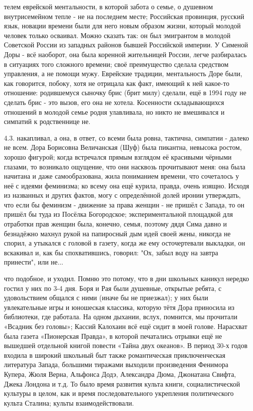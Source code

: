 \label{42-1}
телем еврейской ментальности, в которой забота о семье, о душевном внутрисемейном тепле - не на последнем месте; Российская провинция, русский язык, новации времени были для него новым образом жизни, который молодой человек только осваивал. Можно сказать так: он был эмигрантом в молодой Советской России из западных районов бывшей Российской империи. У Сименой Доры - всё наоборот, она была коренной жительницей России, легче разбиралась в ситуациях того сложного времени; своё преимущество сделала средством управления, а не помощи мужу. Еврейские традиции, ментальность Доре были, как говорится, побоку, хотя не отрицала как факт, имеющий к ней какое-то отношение: родившемуся сыночку брис (брит милу) сделали, ещё в 1994 году не сделать брис - это вызов, его она не хотела. Косенности складывающихся отношений в молодой семье родня улавливала, но никто не вмешивался и симпатий к родственнице не.

\label{43-1}
4.3. накапливал, а она, в ответ, со всеми была ровна, тактична, симпатии - далеко не всем. Дора Борисовна Величанская (Шуф) была пикантна, невысока ростом, хорошо фигурой; когда встречался прямым взглядом её красивыми чёрными глазами, то возникало ощущение, что они насквозь прочитывают меня: она была начитана и даже самообразована, жила пониманием времени, что сочеталось у неё с идеями феминизма; ко всему она ещё курила, правда, очень изящно. Исходя из названных и других фактов, могу с определённой долей иронии утверждать, что если бы феминизм - движение за права женщин - не пришёл с Запада, то он пришёл бы туда из Посёлка Богородское; экспериментальной площадкой для отработки прав женщин была, конечно, семья, поэтому дядя Сима давно и безнадёжно махнул рукой на папиросный дым идей своей жены, никогда не спорил, а утыкался с головой в газету, когда же ему осточертевали выкладки, он вскакивал и, как бы спохватившись, говорил: "Ох, забыл воду на завтра принести", или не...

\label{44-1}
что подобное, и уходил. Помню это потому, что в дни школьных каникул нередко гостил у них по 3-4 дня. Боря и Рая были душевные, открытые ребята, с удовольствием общался с ними (иначе бы не приезжал); у них были увлекательные игры и юношеская классика, которую тётя Дора приносила из библиотеки, где работала. На одном дыхании, вслух, помнится, мы прочитали «Всадник без головы»; Кассий Калохаин всё ещё сидит в моей голове. Нарасхват была газета «Пионерская Правда», в которой печатались отрывки ещё не вышедшей отдельной книгой повести «Тайна двух океанов». В период 30-х годов входила в широкий школьный быт также романтическая приключенческая литература Запада, большими тиражами выходили произведения Фенимора Купера, Жюля Верна, Альфонса Додэ, Александра Дюма, Джонатана Свифта, Джека Лондона и т.д. То было время развития культа книги, социалистической культуры в целом, как и время последовательного укрепления политического культа Сталина; культы взаимодействовали.

